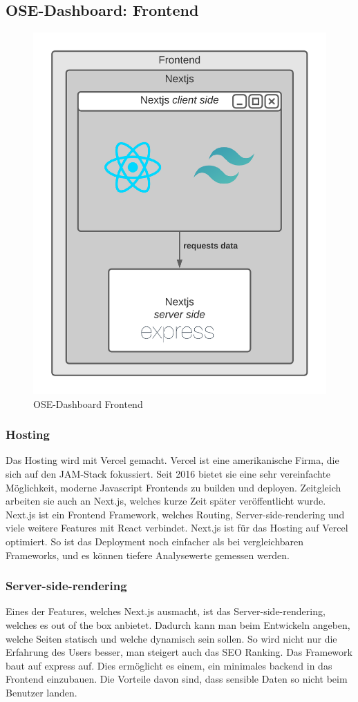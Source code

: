\subsection{OSE-Dashboard: Frontend} \label{arch-frontend}
\begin{figure}[!ht]
  \centering
  \includegraphics[width=.4\linewidth]{./images/frontend.png}
  \caption[{Diagramm OSE-Dashboard Frontend von Jonas Schultheiss}]{OSE-Dashboard Frontend}
  \label{fig:frontend}
\end{figure}
\subsubsection{Hosting}
Das Hosting wird mit Vercel gemacht. Vercel ist eine amerikanische Firma, die sich auf den JAM-Stack fokussiert. Seit 2016 bietet sie eine sehr vereinfachte Möglichkeit, moderne Javascript Frontends zu builden und deployen. Zeitgleich arbeiten sie auch an Next.js, welches kurze Zeit später veröffentlicht wurde. Next.js ist ein Frontend Framework, welches Routing, Server-side-rendering und viele weitere Features mit React verbindet. Next.js ist für das Hosting auf Vercel optimiert. So ist das Deployment noch einfacher als bei vergleichbaren Frameworks, und es können tiefere Analysewerte gemessen werden.
\subsubsection{Server-side-rendering}
Eines der Features, welches Next.js ausmacht, ist das Server-side-rendering, welches es out of the box anbietet. Dadurch kann man beim Entwickeln angeben, welche Seiten statisch und welche dynamisch sein sollen. So wird nicht nur die Erfahrung des Users besser, man steigert auch das SEO Ranking. Das Framework baut auf express auf. Dies ermöglicht es einem, ein minimales backend in das Frontend einzubauen. Die Vorteile davon sind, dass sensible Daten so nicht beim Benutzer landen.
